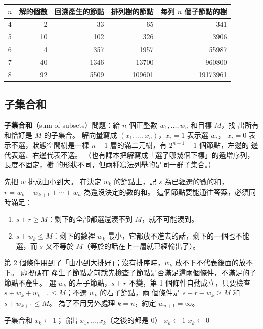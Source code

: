 \begin{center}
\begin{tabular}{crrrr}
\toprule
$n$ & 解的個數 & 回溯產生的節點 & 排列樹的節點 & 每列 $n$ 個子節點的樹 \\
\midrule
4 & 2 & 33 & 65 & 341 \\
5 & 10 & 102 & 326 & 3906 \\
6 & 4 & 357 & 1957 & 55987 \\
7 & 40 & 1346 & 13700 & 960800 \\
8 & 92 & 5509 & 109601 & 19173961 \\
\bottomrule
\end{tabular}
\end{center}

\subsection{子集合和}
\label{sec:bk-subset}

\textbf{子集合和}（sum of subsets）問題：給 $n$ 個正整數 $w_1, \ldots, w_n$ 和目標 $M$，找
出所有和恰好是 $M$ 的子集合。 解向量寫成 $(x_1, \ldots, x_n)$，$x_i = 1$ 表示選 $w_i$，
$x_i = 0$ 表示不選，狀態空間樹是一棵 $n + 1$ 層的滿二元樹，有 $2^{n+1} - 1$ 個節點，左邊的
邊代表選、右邊代表不選。 （也有課本把解寫成「選了哪幾個下標」的遞增序列，長度不固定，樹
的形狀不同，但兩種寫法列舉的是同一群子集合。）

先把 $w$ 排成由小到大。 在決定 $w_k$ 的節點上，記 $s$ 為已經選的數的和，$r = w_k + w_{k+1}
+ \cdots + w_n$ 為還沒決定的數的和。 這個節點要能通往答案，必須同時滿足：

\begin{enumerate}
\item $s + r \ge M$：剩下的全部都選還湊不到 $M$，就不可能湊到。
\item $s + w_k \le M$：剩下的數裡 $w_k$ 最小，它都放不進去的話，剩下的一個也不能選，而
$s$ 又不等於 $M$（等於的話在上一層就已經輸出了）。
\end{enumerate}

第 2 個條件用到了「由小到大排好」；沒有排序時，$w_k$ 放不下不代表後面的放不下。 虛擬碼在
產生子節點之前就先檢查子節點是否滿足這兩個條件，不滿足的子節點不產生。 選 $w_k$ 的左子節點，$s +
r$ 不變，第 1 個條件自動成立，只要檢查 $s + w_k + w_{k+1} \le M$；不選 $w_k$ 的右子節點，兩
個條件是 $s + r - w_k \ge M$ 和 $s + w_{k+1} \le M$。 為了不用另外處理 $k = n$，約定
$w_{n+1} = \infty$。

\begin{pseudo}[label=alg:bk-subset]{子集合和}
 
        \State $x_k \gets 1$；輸出 $x_1, \ldots, x_k$（之後的都是 $0$）
        \State $x_k \gets 1$
        \State {}
    \EndIf
        \State $x_k \gets 0$
        \State {}
    \EndIf
\EndProcedure
\end{pseudo}

